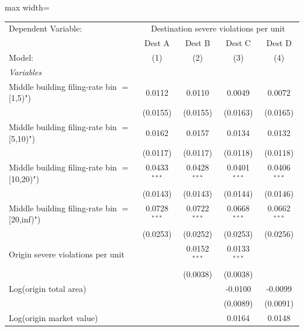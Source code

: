 \documentclass[
  11pt,
]{article}
\begin{document}
\begin{adjustbox}{max width=\textwidth}
\begingroup
\centering
\begin{tabular}{lcccc}
   \tabularnewline \midrule \midrule
   Dependent Variable: & \multicolumn{4}{c}{Destination severe violations per unit}\\
                                                  & Dest A         & Dest B         & Dest C         & Dest D \\   
   Model:                                         & (1)            & (2)            & (3)            & (4)\\  
   \midrule
   \emph{Variables}\\
   Middle building filing-rate bin $=$ [1,5)")    & 0.0112         & 0.0110         & 0.0049         & 0.0072\\   
                                                  & (0.0155)       & (0.0155)       & (0.0163)       & (0.0165)\\   
   Middle building filing-rate bin $=$ [5,10)")   & 0.0162         & 0.0157         & 0.0134         & 0.0132\\   
                                                  & (0.0117)       & (0.0117)       & (0.0118)       & (0.0118)\\   
   Middle building filing-rate bin $=$ [10,20)")  & 0.0433$^{***}$ & 0.0428$^{***}$ & 0.0401$^{***}$ & 0.0406$^{***}$\\   
                                                  & (0.0143)       & (0.0143)       & (0.0144)       & (0.0146)\\   
   Middle building filing-rate bin $=$ [20,inf)") & 0.0728$^{***}$ & 0.0722$^{***}$ & 0.0668$^{***}$ & 0.0662$^{***}$\\   
                                                  & (0.0253)       & (0.0252)       & (0.0253)       & (0.0256)\\   
   Origin severe violations per unit              &                & 0.0152$^{***}$ & 0.0133$^{***}$ &   \\   
                                                  &                & (0.0038)       & (0.0038)       &   \\   
   Log(origin total area)                         &                &                & -0.0100        & -0.0099\\   
                                                  &                &                & (0.0089)       & (0.0091)\\   
   Log(origin market value)                       &                &                & 0.0164         & 0.0148\\   

\end{tabular}
\end{adjustbox}
\end{document}
